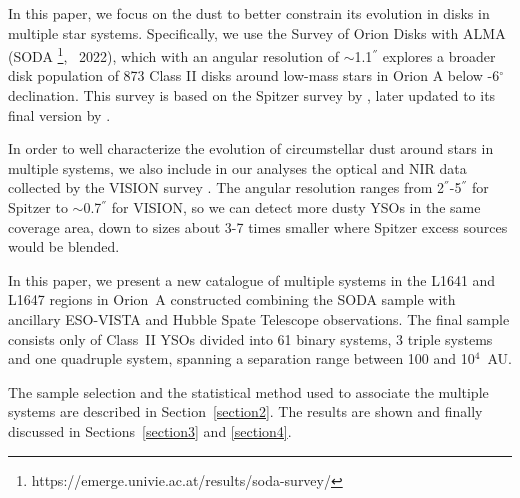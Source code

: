 \documentclass{aa}
\begin{document}
In this paper, we focus on the dust to better constrain its evolution in disks in multiple star systems. Specifically, we use the Survey of Orion Disks with ALMA (SODA \footnote{https://emerge.univie.ac.at/results/soda-survey/}, \citeauthor{vanTerwisga22}~2022), which with an angular resolution of $\sim$1.1$^{''}$ explores a broader disk population of 873 Class II disks around low-mass stars in Orion A below -6$^{\circ}$ declination. This survey is based on the Spitzer survey by \cite{Megeath12}, later updated to its final version by \cite{Megeath16}. \par
In order to well characterize the evolution of circumstellar dust around stars in multiple systems, we also include in our analyses the optical and NIR data collected by the VISION survey \citep{Meingast16}. The angular resolution ranges from 2$^{''}$-5$^{''}$ for Spitzer to $\sim$0.7$^{''}$ for VISION, so we can detect more dusty YSOs in the same coverage area, down to sizes about 3-7 times smaller where Spitzer excess sources would be blended. \par
In this paper, we present a new catalogue of multiple systems in the L1641 and L1647 regions in Orion~A constructed combining the SODA sample \citep{vanTerwisga22} with ancillary ESO-VISTA \citep{Meingast16, Grosschedl19} and Hubble Spate Telescope \citep{Kounkel16} observations. The final sample consists only of Class~II YSOs divided into 61 binary systems, 3 triple systems and one quadruple system, spanning a separation range between 100 and 10$^4$~AU. \par 
The sample selection and the statistical method used to associate the multiple systems are described in Section~\ref{section2}. The results are shown and finally discussed in Sections~\ref{section3} and \ref{section4}. 
\end{document}
